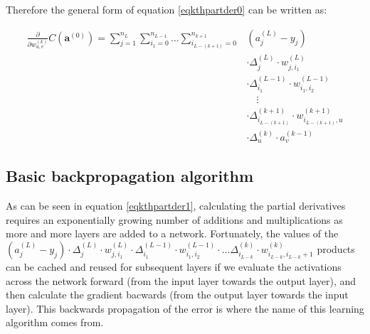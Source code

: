 \documentclass{article}
\begin{document}
          Therefore the general form of equation \ref{eqkthpartder0} can be
          written as:

          \begin{equation}\label{eqkthpartder1}
            \begin{split}
              \frac{\partial}{\partial w_{u,v}^{(k)}}
                C \left( \mathbf{a}^{(0)} \right)
                    = \sum_{j=1}^{n_L}
                        \sum_{i_1=0}^{n_{L-1}}
                          \ldots
                          \sum_{i_{L-(k+1)}=0}^{n_{k+1}}
                            & \left( a_j^{(L)} - y_j \right) \\
                            & \cdot
                              \Delta_j^{(L)}
                              \cdot
                              w_{j,i_1}^{(L)} \\
                            & \cdot
                              \Delta_{i_1}^{(L-1)}
                              \cdot
                              w_{i_1,i_2}^{(L-1)} \\
                            & \quad \vdots \\
                            & \cdot
                              \Delta_{i_{L-(k+1)}}^{(k+1)}
                              \cdot
                              w_{i_{L-(k+1)},u}^{(k+1)} \\
                            & \cdot
                              \Delta_u^{(k)}
                              \cdot
                              a_v^{(k-1)}
            \end{split}
          \end{equation}

    \subsection{Basic backpropagation algorithm}

      As can be seen in equation \ref{eqkthpartder1}, calculating the partial
      derivatives requires an exponentially growing number of additions and
      multiplications as more and more layers are added to a network.
      Fortunately, the values of the
      $
        \left( a_j^{(L)} - y_j \right)
        \cdot
        \Delta_j^{(L)}
        \cdot
        w_{j,i_1}^{(L)}
        \cdot
        \Delta_{i_1}^{(L-1)}
        \cdot
        w_{i_1,i_2}^{(L-1)}
        \cdot
        \ldots
        \Delta_{i_{L-k}}^{(k)}
        \cdot
        w_{i_{L-k},i_{L-k}+1}^{(k)}
      $ products can be cached and reused for subsequent layers if we evaluate
      the activations across the network forward (from the input layer towards
      the output layer), and then calculate the gradient bacwards (from the
      output layer towards the input layer). This backwards propagation of the
      error is where the name of this learning algorithm comes from.
\end{document}
